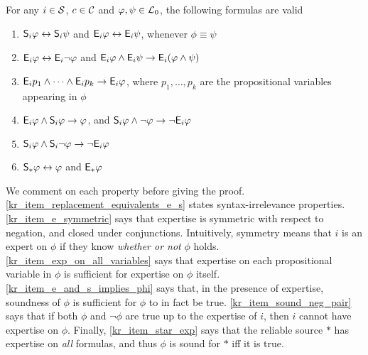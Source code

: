 \begin{proposition}
\label{kr_prop_validities}
For any $i \in \mathcal{S}$, $c \in \mathcal{C}$ and $\varphi, \psi \in \mathcal{L}{}_0$, the following
formulas are valid
\begin{enumerate}
    \item \label{kr_item_replacement_equivalents_e_s}
          $\mathsf{S}_i\varphi \leftrightarrow \mathsf{S}_i\psi$ and $\mathsf{E}_i\varphi \leftrightarrow
          \mathsf{E}_i\psi$, whenever $\phi \equiv \psi$
    \item \label{kr_item_e_symmetric}
          $\mathsf{E}_i\varphi \leftrightarrow \mathsf{E}_i\neg\varphi$ and $\mathsf{E}_i\varphi \land
          \mathsf{E}_i\psi \to \mathsf{E}_i(\varphi \land \psi)$
    \item \label{kr_item_exp_on_all_variables} $\mathsf{E}_i{p_1} \land \cdots \land
          \mathsf{E}_i{p_k} \to \mathsf{E}_i\varphi$, where $p_1, \ldots, p_k$ are the
          propositional variables appearing in $\phi$
    \item \label{kr_item_e_and_s_implies_phi}
          $\mathsf{E}_i\varphi \land \mathsf{S}_i\varphi \to \varphi$, and
          $\mathsf{S}_i\varphi \land \neg \varphi \to \neg \mathsf{E}_i\varphi$
    \item \label{kr_item_sound_neg_pair}
          $\mathsf{S}_i\varphi \land \mathsf{S}_i{\neg \varphi} \to \neg \mathsf{E}_i\varphi$
    \item \label{kr_item_star_exp}
          $\mathsf{S}_\ast{\varphi} \leftrightarrow \varphi$ and $\mathsf{E}_\ast\varphi$
\end{enumerate}
\end{proposition}

We comment on each property before giving the proof.
\cref{kr_item_replacement_equivalents_e_s} states syntax-irrelevance
properties.
%
\cref{kr_item_e_symmetric} says that expertise is symmetric with respect to
negation, and closed under conjunctions. Intuitively, symmetry means that $i$
is an expert on $\phi$ if they know \emph{whether or not} $\phi$ holds.
%
\cref{kr_item_exp_on_all_variables} says that expertise on each
propositional variable in $\phi$ is sufficient for expertise on $\phi$ itself.
%
\cref{kr_item_e_and_s_implies_phi} says that, in the presence of expertise,
soundness of $\phi$ is sufficient for $\phi$ to in fact be true.
%
\cref{kr_item_sound_neg_pair} says that if both $\phi$ and $\neg\phi$ are
true up to the expertise of $i$, then $i$ cannot have expertise on $\phi$.
%
Finally, \cref{kr_item_star_exp} says that the reliable source $\ast$ has
expertise on \emph{all} formulas, and thus $\phi$ is sound for $\ast$ iff it is
true.

